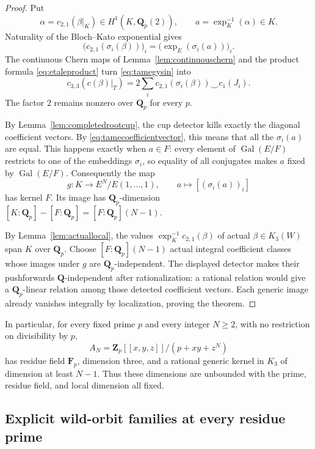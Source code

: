 \documentclass[11pt,a4paper]{article}
\theoremstyle{remark}
\newcommand{\Q}{\mathbf Q}
\newcommand{\Z}{\mathbf Z}
\newcommand{\F}{\mathbf F}
\newcommand{\Gal}{\operatorname{Gal}}
\begin{document}
\begin{proof}
Put
\[
\alpha=c_{2,1}(\beta|_K)\in H^1(K,\Q_p(2)),
\qquad a=\exp_K^{-1}(\alpha)\in K.
\]
Naturality of the Bloch--Kato exponential gives
\begin{equation}\label{eq:tamecoefficientvector}
\bigl(c_{2,1}(\sigma_i(\beta))\bigr)_i
=\bigl(\exp_E(\sigma_i(a))\bigr)_i.
\end{equation}
The continuous Chern maps of Lemma~\ref{lem:continuouschern} and the product formula \eqref{eq:etaleproduct} turn \eqref{eq:tamegysin} into
\[
c_{3,3}(c(\beta)|_T)
=2\sum_i c_{2,1}(\sigma_i(\beta))\smile c_1(J_i).
\]
The factor $2$ remains nonzero over $\Q_p$ for every $p$.

By Lemma~\ref{lem:completedrootcup}, the cup detector kills exactly the diagonal coefficient vectors. By \eqref{eq:tamecoefficientvector}, this means that all the $\sigma_i(a)$ are equal. This happens exactly when $a\in F$: every element of $\Gal(E/F)$ restricts to one of the embeddings $\sigma_i$, so equality of all conjugates makes $a$ fixed by $\Gal(E/F)$. Consequently the map
\[
g:K\longrightarrow E^N/E(1,\ldots,1),
\qquad a\longmapsto[(\sigma_i(a))_i]
\]
has kernel $F$. Its image has $\Q_p$-dimension
$[K:\Q_p]-[F:\Q_p]=[F:\Q_p](N-1)$.

By Lemma~\ref{lem:actuallocal}, the values
$\exp_K^{-1}c_{2,1}(\beta)$ of actual $\beta\in K_3(W)$ span $K$ over $\Q_p$. Choose $[F:\Q_p](N-1)$ actual integral coefficient classes whose images under $g$ are $\Q_p$-independent. The displayed detector makes their pushforwards $\Q$-independent after rationalization: a rational relation would give a $\Q_p$-linear relation among those detected coefficient vectors. Each generic image already vanishes integrally by localization, proving the theorem.
\end{proof}

In particular, for every fixed prime $p$ and every integer $N\geq2$, with no restriction on divisibility by $p$,
\[
A_N=\Z_p[[x,y,z]]/(p+xy+z^N)
\]
has residue field $\F_p$, dimension three, and a rational generic kernel in $K_3$ of dimension at least $N-1$. Thus these dimensions are unbounded with the prime, residue field, and local dimension all fixed.


\subsection{Explicit wild-orbit families at every residue prime}
\label{sec:explicitwildorbit}
\end{document}
